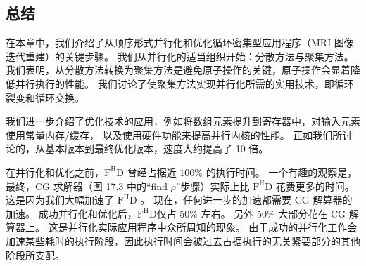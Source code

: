 \subsection{总结}
在本章中，我们介绍了从顺序形式并行化和优化循环密集型应用程序（MRI 图像迭代重建）的关键步骤。 
我们从并行化的适当组织开始：分散方法与聚集方法。 
我们表明，从分散方法转换为聚集方法是避免原子操作的关键，原子操作会显着降低并行执行的性能。 
我们讨论了使聚集方法实现并行化所需的实用技术，即循环裂变和循环交换。

我们进一步介绍了优化技术的应用，例如将数组元素提升到寄存器中，对输入元素使用常量内存/缓存，
以及使用硬件功能来提高并行内核的性能。 正如我们所讨论的，从基本版本到最终优化版本，速度大约提高了 10 倍。

在并行化和优化之前，$\mathrm{F}^{\mathrm{H}} \mathrm{D}$ 曾经占据近 $100 \%$ 的执行时间。 
一个有趣的观察是，最终，CG 求解器（图 17.3 中的“find $\rho$”步骤）实际上比 $\mathrm{F}^{\mathrm{H}} \mathrm{D}$ 花费更多的时间。 
这是因为我们大幅加速了 $\mathrm{F}^{\mathrm{H}} \mathrm{D}$ 。 现在，任何进一步的加速都需要 CG 解算器的加速。 
成功并行化和优化后，$\mathrm{F}^{\mathrm{H}} \mathrm{D}$仅占 50\% 左右。 
另外 50\% 大部分花在 CG 解算器上。 这是并行化实际应用程序中众所周知的现象。 
由于成功的并行化工作会加速某些耗时的执行阶段，因此执行时间会被过去占据执行的无关紧要部分的其他阶段所支配。